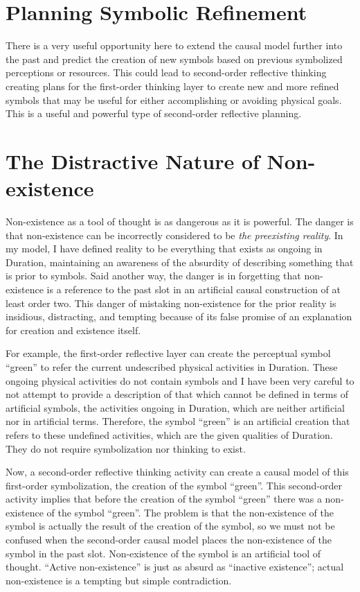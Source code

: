 \section{Planning Symbolic Refinement}

There is a very useful opportunity here to extend the causal model
further into the past and predict the creation of new symbols based on
previous symbolized perceptions or resources.  This could lead to
second-order reflective thinking creating plans for the first-order
thinking layer to create new and more refined symbols that may be
useful for either accomplishing or avoiding physical goals.  This is a
useful and powerful type of second-order reflective planning.

\section{The Distractive Nature of Non-existence}

Non-existence as a tool of thought is as dangerous as it is powerful.
The danger is that non-existence can be incorrectly considered to be
\emph{the preexisting reality}.  In my model, I have defined reality
to be everything that exists as ongoing in Duration, maintaining an
awareness of the absurdity of describing something that is prior to
symbols.  Said another way, the danger is in forgetting that
non-existence is a reference to the past slot in an artificial causal
construction of at least order two.  This danger of mistaking
non-existence for the prior reality is insidious, distracting, and
tempting because of its false promise of an explanation for creation
and existence itself.

For example, the first-order reflective layer can create the
perceptual symbol ``green'' to refer the current undescribed physical
activities in Duration.  These ongoing physical activities do not
contain symbols and I have been very careful to not attempt to provide
a description of that which cannot be defined in terms of artificial
symbols, the activities ongoing in Duration, which are neither
artificial nor in artificial terms.  Therefore, the symbol ``green''
is an artificial creation that refers to these undefined activities,
which are the given qualities of Duration.  They do not require
symbolization nor thinking to exist.

Now, a second-order reflective thinking activity can create a causal
model of this first-order symbolization, the creation of the symbol
``green''.  This second-order activity implies that before the
creation of the symbol ``green'' there was a non-existence of the
symbol ``green''.  The problem is that the non-existence of the symbol
is actually the result of the creation of the symbol, so we must not
be confused when the second-order causal model places the
non-existence of the symbol in the past slot.  Non-existence of the
symbol is an artificial tool of thought.  ``Active non-existence'' is
just as absurd as ``inactive existence''; actual non-existence is a
tempting but simple contradiction.

